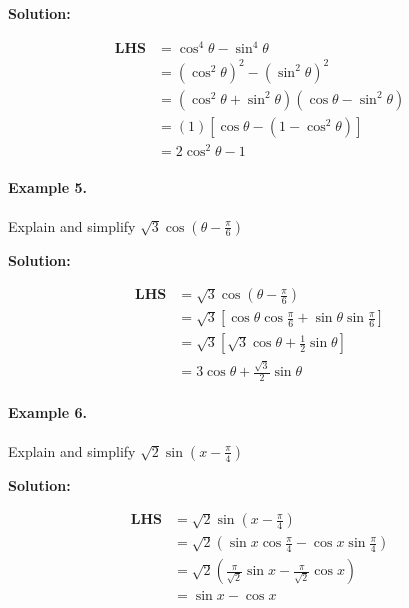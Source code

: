 \documentclass{article}
\begin{document}
{\scriptsize \textbf{Solution:}}

\[
  \begin{aligned}
    \textbf{LHS} &= \cos^{4}\theta-\sin^{4}\theta \\
                 &= (\cos^{2}\theta)^{2} - (\sin^{2}\theta)^{2} \\
                 &= (\cos^{2}\theta+\sin^{2}\theta)(\cos\theta - \sin^{2}\theta) \\
                 &= (1)[\cos\theta - (1-\cos^{2}\theta)] \\
                 &= 2\cos^{2}\theta - 1
  \end{aligned}
\]

\paragraph{Example 5.}
Explain and simplify $\sqrt{3} \cos \left( \theta - \frac{\pi}{6} \right)$

{\scriptsize \textbf{Solution:}}

\[
  \begin{aligned}
    \textbf{LHS} &= \sqrt{3} \cos \left( \theta - \frac{\pi}{6} \right) \\
                 &= \sqrt{3} \left[ \cos\theta \cos\frac{\pi}{6} + \sin\theta \sin\frac{\pi}{6} \right] \\
                 &= \sqrt{3} \left[ \sqrt{3} \cos\theta + \frac{1}{2} \sin\theta \right] \\
                 &= 3 \cos\theta + \frac{\sqrt{3}}{2} \sin\theta
  \end{aligned}
\]

\paragraph{Example 6.}
Explain and simplify $\sqrt{2} \sin \left( x - \frac{\pi}{4} \right)$

{\scriptsize \textbf{Solution:}}

\[
  \begin{aligned}
    \textbf{LHS} &= \sqrt{2} \sin \left( x - \frac{\pi}{4} \right) \\
                 &= \sqrt{2} \left( \sin x \cos\frac{\pi}{4} - \cos x \sin\frac{\pi}{4} \right) \\
                 &= \sqrt{2} \left( \frac{\pi}{\sqrt{2}} \sin x - \frac{\pi}{\sqrt{2}} \cos x \right) \\
                 &= \sin x - \cos x
  \end{aligned}
\]
\end{document}
